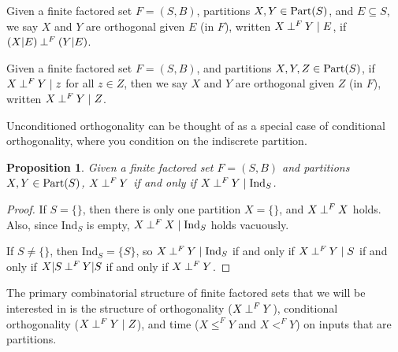 \documentclass[authordate,onecolumn]{miri-tech-article}
\newtheorem{proposition}{Proposition}
\begin{document}
\begin{definition}
Given a finite factored set $F=(S,B)$, partitions $X,Y\in \text{Part}(S)$, and $E\subseteq S$, we say $X$ and $Y$ are orthogonal given $E$ (in $F$), written $X\mathbin{\perp^{F}}Y\mid E$, if $(X|E)\mathbin{\perp^{F}}(Y|E)$.
\end{definition}
\begin{definition}
Given a finite factored set $F=(S,B)$, and partitions $X,Y, Z\in \text{Part}(S)$, if $X\mathbin{\perp^{F}}Y\mid z$ for all $z\in Z$, then we say $X$ and $Y$ are orthogonal given $Z$ (in $F$), written $X\mathbin{\perp^{F}}Y\mid Z$.
\end{definition}
Unconditioned orthogonality can be thought of as a special case of conditional orthogonality, where you condition on the indiscrete partition.
\begin{proposition}
Given a finite factored set $F=(S,B)$ and partitions $X,Y\in \text{Part}(S)$, $X\mathbin{\perp^{F}}Y$ if and only if $X\mathbin{\perp^{F}}Y\mid \text{Ind}_S$.
\end{proposition}
\begin{proof}
If $S=\{\}$, then there is only one partition $X=\{\}$, and $X\mathbin{\perp^{F}}X$ holds. Also, since $\text{Ind}_S$ is empty, $X\mathbin{\perp^{F}}X\mid \text{Ind}_S$ holds vacuously.

If $S\neq\{\}$, then $\text{Ind}_S=\{S\}$, so $X\mathbin{\perp^{F}}Y\mid \text{Ind}_S$ if and only if $X\mathbin{\perp^{F}}Y\mid S$ if and only if $X|S\mathbin{\perp^{F}}Y|S$ if and only if $X\mathbin{\perp^{F}}Y$.
\end{proof}
The primary combinatorial structure of finite factored sets that we will be interested in is the structure of orthogonality ($X\mathbin{\perp^{F}}Y$), conditional orthogonality ($X\mathbin{\perp^{F}}Y\mid Z$), and time ($X\leq^F Y$ and $X<^F Y$)
on inputs that are partitions.
\end{document}
